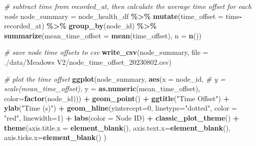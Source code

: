 \documentclass[
]{book}
\newenvironment{Shaded}{\begin{snugshade}}{\end{snugshade}}
\newcommand{\AttributeTok}[1]{\textcolor[rgb]{0.13,0.29,0.53}{#1}}
\newcommand{\CommentTok}[1]{\textcolor[rgb]{0.56,0.35,0.01}{\textit{#1}}}
\newcommand{\DecValTok}[1]{\textcolor[rgb]{0.00,0.00,0.81}{#1}}
\newcommand{\FunctionTok}[1]{\textcolor[rgb]{0.13,0.29,0.53}{\textbf{#1}}}
\newcommand{\NormalTok}[1]{#1}
\newcommand{\OtherTok}[1]{\textcolor[rgb]{0.56,0.35,0.01}{#1}}
\newcommand{\SpecialCharTok}[1]{\textcolor[rgb]{0.81,0.36,0.00}{\textbf{#1}}}
\newcommand{\StringTok}[1]{\textcolor[rgb]{0.31,0.60,0.02}{#1}}
\begin{document}
\begin{Shaded}
\begin{Highlighting}[]
\CommentTok{\# subtract time from recorded\_at, then calculate the average time offset for each node}
\NormalTok{node\_summary }\OtherTok{=}\NormalTok{ node\_health\_df }\SpecialCharTok{\%\textgreater{}\%}
  \FunctionTok{mutate}\NormalTok{(}\AttributeTok{time\_offset =}\NormalTok{ time}\SpecialCharTok{{-}}\NormalTok{recorded\_at) }\SpecialCharTok{\%\textgreater{}\%}
  \FunctionTok{group\_by}\NormalTok{(node\_id) }\SpecialCharTok{\%\textgreater{}\%}
  \FunctionTok{summarize}\NormalTok{(}\AttributeTok{mean\_time\_offset =} \FunctionTok{mean}\NormalTok{(time\_offset), }\AttributeTok{n =} \FunctionTok{n}\NormalTok{())}

\CommentTok{\# save node time offsets to csv}
\FunctionTok{write\_csv}\NormalTok{(node\_summary,}
                 \AttributeTok{file =} \StringTok{\textquotesingle{}./data/Meadows V2/node\_time\_offset\_20230802.csv\textquotesingle{}}\NormalTok{)}

\CommentTok{\# plot the time offset}
\FunctionTok{ggplot}\NormalTok{(node\_summary,}
       \FunctionTok{aes}\NormalTok{(}\AttributeTok{x =}\NormalTok{ node\_id, }
           \CommentTok{\# y = scale(mean\_time\_offset),}
           \AttributeTok{y =} \FunctionTok{as.numeric}\NormalTok{(mean\_time\_offset),}
           \AttributeTok{color=}\FunctionTok{factor}\NormalTok{(node\_id))) }\SpecialCharTok{+}
  \FunctionTok{geom\_point}\NormalTok{() }\SpecialCharTok{+}
  \FunctionTok{ggtitle}\NormalTok{(}\StringTok{"Time Offset"}\NormalTok{) }\SpecialCharTok{+}
  \FunctionTok{ylab}\NormalTok{(}\StringTok{"Time (s)"}\NormalTok{) }\SpecialCharTok{+}
  \FunctionTok{geom\_hline}\NormalTok{(}\AttributeTok{yintercept=}\DecValTok{0}\NormalTok{, }
             \AttributeTok{linetype=}\StringTok{"dotted"}\NormalTok{, }
             \AttributeTok{color =} \StringTok{"red"}\NormalTok{, }
             \AttributeTok{linewidth=}\DecValTok{1}\NormalTok{) }\SpecialCharTok{+}
  \FunctionTok{labs}\NormalTok{(}\AttributeTok{color =} \StringTok{\textquotesingle{}Node ID\textquotesingle{}}\NormalTok{) }\SpecialCharTok{+}
  \FunctionTok{classic\_plot\_theme}\NormalTok{() }\SpecialCharTok{+}
  \FunctionTok{theme}\NormalTok{(}\AttributeTok{axis.title.x =} \FunctionTok{element\_blank}\NormalTok{(),}
        \AttributeTok{axis.text.x=}\FunctionTok{element\_blank}\NormalTok{(),}
        \AttributeTok{axis.ticks.x=}\FunctionTok{element\_blank}\NormalTok{()}
\NormalTok{        )}
\end{Highlighting}
\end{Shaded}
\end{document}
